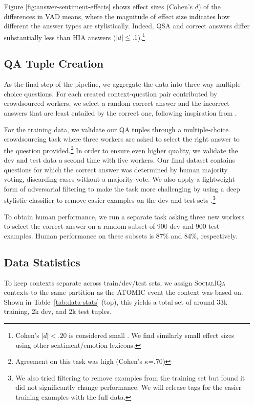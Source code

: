 Figure \ref{fig:answer-sentiment-effects} shows effect sizes (Cohen's $d$) of the differences in VAD means, where the magnitude of effect size indicates how different the answer types are stylistically. Indeed, QSA and correct answers differ substantially less than HIA answers ($|d|{\leq}.1$).\footnote{Cohen's $|d|{<}.20$ is considered small \cite{Sawilowsky2009NewES}. We find similarly small effect sizes using other sentiment/emotion lexicons.}

\subsection{QA Tuple Creation} As the final step of the pipeline, we aggregate the data into three-way multiple choice questions. For each created context-question pair contributed by crowdsourced workers, we select a random correct answer and the incorrect answers that are least entailed by the correct one, following inspiration from \citet{Zellers2019vcr}.

For the training data, we validate our QA tuples through a multiple-choice crowdsourcing task where three workers are asked to select the right answer to the question provided.\footnote{Agreement on this task was high (Cohen's $\kappa$=.70)}
In order to ensure even higher quality, we validate the dev and test data a second time with five workers. Our final dataset contains questions for which the correct answer was determined by human majority voting, discarding cases without a majority vote. We also apply a lightweight form of adversarial filtering to make the task more challenging  by using a deep stylistic classifier to remove easier examples on the dev and test sets \citep[][]{Winogrande}.\footnote{We also tried filtering to remove examples from the training set but found it did not significantly change performance. We will release tags for the easier training examples with the full data.}

To obtain human performance, we run a separate task asking three new workers to select the correct answer on a random subset of 900 dev and 900 test examples. Human performance on these subsets is 87\% and 84\%, respectively.

\subsection{Data Statistics}

To keep contexts separate across train/dev/test sets, we assign \textsc{SocialIQa} contexts to the same partition as the ATOMIC event the context was based on. Shown in Table~\ref{tab:data-stats} (top), this yields a total set of around 33k training, 2k dev, and 2k test tuples.

